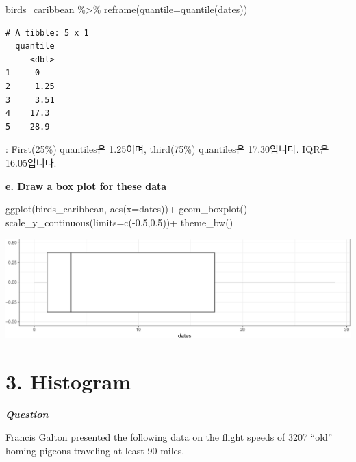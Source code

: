 \documentclass[
  a4paper,
  DIV=11,
  numbers=noendperiod]{scrreprt}
\newenvironment{Shaded}{\begin{snugshade}}{\end{snugshade}}
\newcommand{\AttributeTok}[1]{\textcolor[rgb]{0.40,0.45,0.13}{#1}}
\newcommand{\FloatTok}[1]{\textcolor[rgb]{0.68,0.00,0.00}{#1}}
\newcommand{\FunctionTok}[1]{\textcolor[rgb]{0.28,0.35,0.67}{#1}}
\newcommand{\NormalTok}[1]{\textcolor[rgb]{0.00,0.23,0.31}{#1}}
\newcommand{\SpecialCharTok}[1]{\textcolor[rgb]{0.37,0.37,0.37}{#1}}
\begin{document}
\begin{Shaded}
\begin{Highlighting}[]
\NormalTok{birds\_caribbean }\SpecialCharTok{\%\textgreater{}\%} 
  \FunctionTok{reframe}\NormalTok{(}\AttributeTok{quantile=}\FunctionTok{quantile}\NormalTok{(dates))}
\end{Highlighting}
\end{Shaded}

\begin{verbatim}
# A tibble: 5 x 1
  quantile
     <dbl>
1     0   
2     1.25
3     3.51
4    17.3 
5    28.9 
\end{verbatim}

: First(25\%) quantiles은 1.25이며, third(75\%) quantiles은 17.30입니다.
IQR은 16.05입니다.

\textbf{e. Draw a box plot for these data}

\begin{Shaded}
\begin{Highlighting}[]
\FunctionTok{ggplot}\NormalTok{(birds\_caribbean, }\FunctionTok{aes}\NormalTok{(}\AttributeTok{x=}\NormalTok{dates))}\SpecialCharTok{+}
  \FunctionTok{geom\_boxplot}\NormalTok{()}\SpecialCharTok{+}
  \FunctionTok{scale\_y\_continuous}\NormalTok{(}\AttributeTok{limits=}\FunctionTok{c}\NormalTok{(}\SpecialCharTok{{-}}\FloatTok{0.5}\NormalTok{,}\FloatTok{0.5}\NormalTok{))}\SpecialCharTok{+}
  \FunctionTok{theme\_bw}\NormalTok{()}
\end{Highlighting}
\end{Shaded}

\includegraphics{경영통계분석_hw1_files/figure-pdf/unnamed-chunk-6-1.pdf}

\section*{3. Histogram}\label{histogram}


\textbf{\emph{Question}}

Francis Galton presented the following data on the flight speeds of 3207
``old'' homing pigeons traveling at least 90 miles.
\end{document}
